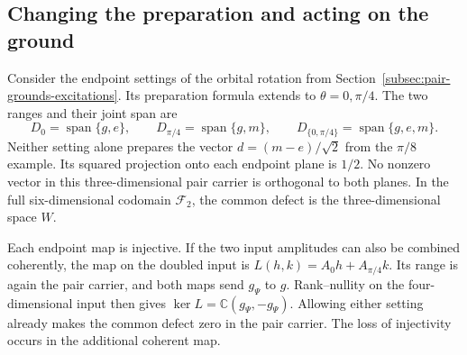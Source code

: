 \documentclass[11pt]{article}
\theoremstyle{definition}
\DeclareMathOperator{\Span}{span}
\newcommand{\C}{\mathbb C}
\begin{document}
\subsection{Changing the preparation and acting on the ground}
Consider the endpoint settings of the orbital rotation from Section~\ref{subsec:pair-grounds-excitations}. Its preparation formula extends to $\theta=0,\pi/4$. The two ranges and their joint span are
\begin{equation}
 D_0=\Span\{g,e\},\qquad D_{\pi/4}=\Span\{g,m\},\qquad
 D_{\{0,\pi/4\}}=\Span\{g,e,m\}.
 \label{eq:pair-two-setting-ranges}
\end{equation}
Neither setting alone prepares the vector $d=(m-e)/\sqrt2$ from the $\pi/8$ example. Its squared projection onto each endpoint plane is $1/2$. No nonzero vector in this three-dimensional pair carrier is orthogonal to both planes. In the full six-dimensional codomain $\mathcal F_2$, the common defect is the three-dimensional space $W$.

Each endpoint map is injective. If the two input amplitudes can also be combined coherently, the map on the doubled input is $L(h,k)=A_0 h+A_{\pi/4}k$. Its range is again the pair carrier, and both maps send $g_\Psi$ to $g$. Rank--nullity on the four-dimensional input then gives $\ker L=\C(g_\Psi,-g_\Psi)$. Allowing either setting already makes the common defect zero in the pair carrier. The loss of injectivity occurs in the additional coherent map.
\end{document}
